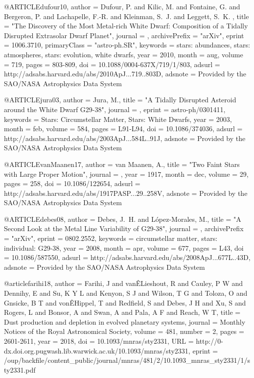 \documentclass[a4paper,fleqn,usenatbib]{mnras}
\begin{document}
{{{{{@ARTICLE{dufour10,
   author = {{Dufour}, P. and {Kilic}, M. and {Fontaine}, G. and {Bergeron}, P. and 
	{Lachapelle}, F.-R. and {Kleinman}, S.~J. and {Leggett}, S.~K.
	},
    title = "{The Discovery of the Most Metal-rich White Dwarf: Composition of a Tidally Disrupted Extrasolar Dwarf Planet}",
  journal = {\apj},
archivePrefix = "arXiv",
   eprint = {1006.3710},
 primaryClass = "astro-ph.SR",
 keywords = {stars: abundances, stars: atmospheres, stars: evolution, white dwarfs},
     year = 2010,
    month = aug,
   volume = 719,
    pages = {803-809},
      doi = {10.1088/0004-637X/719/1/803},
   adsurl = {http://adsabs.harvard.edu/abs/2010ApJ...719..803D},
  adsnote = {Provided by the SAO/NASA Astrophysics Data System}
}

@ARTICLE{jura03,
   author = {{Jura}, M.},
    title = "{A Tidally Disrupted Asteroid around the White Dwarf G29-38}",
  journal = {\apjl},
   eprint = {astro-ph/0301411},
 keywords = {Stars: Circumstellar Matter, Stars: White Dwarfs},
     year = 2003,
    month = feb,
   volume = 584,
    pages = {L91-L94},
      doi = {10.1086/374036},
   adsurl = {http://adsabs.harvard.edu/abs/2003ApJ...584L..91J},
  adsnote = {Provided by the SAO/NASA Astrophysics Data System}
}

@ARTICLE{vanMaanen17,
   author = {{van Maanen}, A.},
    title = "{Two Faint Stars with Large Proper Motion}",
  journal = {\pasp},
     year = 1917,
    month = dec,
   volume = 29,
    pages = {258},
      doi = {10.1086/122654},
   adsurl = {http://adsabs.harvard.edu/abs/1917PASP...29..258V},
  adsnote = {Provided by the SAO/NASA Astrophysics Data System}
}

@ARTICLE{debes08,
   author = {{Debes}, J.~H. and {L{\'o}pez-Morales}, M.},
    title = "{A Second Look at the Metal Line Variability of G29-38}",
  journal = {\apjl},
archivePrefix = "arXiv",
   eprint = {0802.2552},
 keywords = {circumstellar matter, stars: individual: G29-38},
     year = 2008,
    month = apr,
   volume = 677,
    pages = {L43},
      doi = {10.1086/587550},
   adsurl = {http://adsabs.harvard.edu/abs/2008ApJ...677L..43D},
  adsnote = {Provided by the SAO/NASA Astrophysics Data System}
}

@article{farihi18,
author = {Farihi, J and vanÊLieshout, R and Cauley, P W and Dennihy, E and Su, K Y L and Kenyon, S J and Wilson, T G and Toloza, O and Gnsicke, B T and vonÊHippel, T and Redfield, S and Debes, J H and Xu, S and Rogers, L and Bonsor, A and Swan, A and Pala, A F and Reach, W T},
title = {Dust production and depletion in evolved planetary systems},
journal = {Monthly Notices of the Royal Astronomical Society},
volume = {481},
number = {2},
pages = {2601-2611},
year = {2018},
doi = {10.1093/mnras/sty2331},
URL = {http://0-dx.doi.org.pugwash.lib.warwick.ac.uk/10.1093/mnras/sty2331},
eprint = {/oup/backfile/content_public/journal/mnras/481/2/10.1093_mnras_sty2331/1/sty2331.pdf}
}



}}}}}
\end{document}
